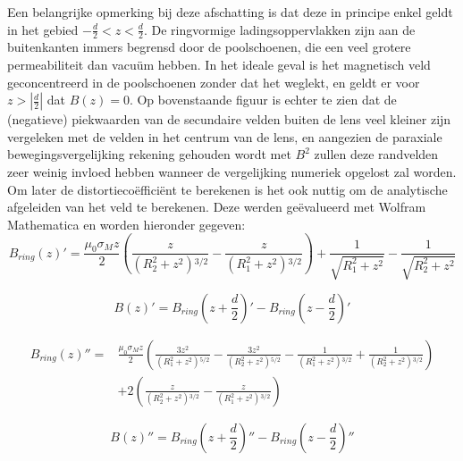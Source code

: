 \documentclass[we,twoside,openright,a4paper,11pt]{uantwerpenbamathesis}
\begin{document}
Een belangrijke opmerking bij deze afschatting is dat deze in principe enkel geldt in het gebied $-\frac{d}{2}<z<\frac{d}{2}$. De ringvormige ladingsoppervlakken zijn aan de buitenkanten immers begrensd door de poolschoenen, die een veel grotere permeabiliteit dan vacuüm hebben. In het ideale geval is het magnetisch veld geconcentreerd in de poolschoenen zonder dat het weglekt, en geldt er voor $z>\left|\frac{d}{2}\right|$ dat $B(z)=0$. Op bovenstaande figuur is echter te zien dat de (negatieve) piekwaarden van de secundaire velden buiten de lens veel kleiner zijn vergeleken met de velden in het centrum van de lens, en aangezien de paraxiale bewegingsvergelijking rekening gehouden wordt met $B^2$ zullen deze randvelden zeer weinig invloed hebben wanneer de vergelijking numeriek opgelost zal worden.\\

Om later de distortiecoëfficiënt te berekenen is het ook nuttig om de analytische afgeleiden van het veld te berekenen. Deze werden geëvalueerd met Wolfram Mathematica en worden hieronder gegeven:
\begin{equation}
    B_{ring}(z)'= \frac{\mu_0\sigma_Mz}{2} \left(\frac{z}{\left(R_2^2+z^2\right){}^{3/2}}-\frac{z}{\left(R_1^2+z^2\right){}^{3/2}}\right)+\frac{1}{\sqrt{R_1^2+z^2}}-\frac{1}{\sqrt{R_2^2+z^2}}
\end{equation}

\begin{equation}
    B(z)'= B_{ring}\left(z+\frac{d}{2}\right)' - B_{ring}\left(z-\frac{d}{2}\right)'
\end{equation}

\begin{equation}
\begin{split}
    B_{ring}(z)''= & \frac{\mu_0\sigma_Mz}{2} \left(\frac{3 z^2}{\left(R_1^2+z^2\right){}^{5/2}}-\frac{3 z^2}{\left(R_2^2+z^2\right){}^{5/2}}-\frac{1}{\left(R_1^2+z^2\right){}^{3/2}}+\frac{1}{\left(R_2^2+z^2\right){}^{3/2}}\right)\\
    &+2 \left(\frac{z}{\left(R_2^2+z^2\right){}^{3/2}}-\frac{z}{\left(R_1^2+z^2\right){}^{3/2}}\right)
\end{split}
\end{equation}

\begin{equation}
   B(z)''= B_{ring}\left(z+\frac{d}{2}\right)'' - B_{ring}\left(z-\frac{d}{2}\right)''
\end{equation}
\end{document}
